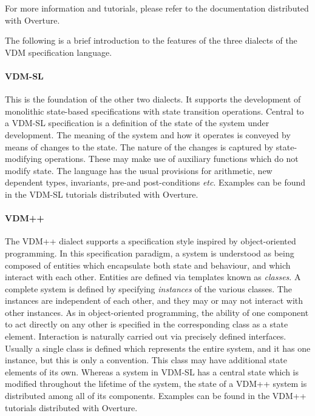 For more information and tutorials, please refer to the documentation distributed with Overture.

The following is a brief introduction to the features of the three dialects of the VDM specification language.
%
\paragraph{VDM-SL}
This is the foundation of the other two dialects.
%
It supports the development of monolithic state-based specifications with state transition operations.
%
Central to a VDM-SL specification is a definition of the state of the system under development.
%
The meaning of the system and how it operates is conveyed by means of changes to the state.
%
The nature of the changes is captured by state-modifying operations.
%
These may make use of auxiliary functions which do not modify state.
%
The language has the usual provisions for arithmetic, new dependent types, invariants, pre-\@ and post-conditions \emph{etc}.
%
Examples can be found in the VDM-SL tutorials distributed with Overture.
%
\paragraph{VDM++}
The VDM++ dialect supports a specification style inspired by object-oriented programming.
%
In this specification paradigm, a system is understood as being composed of entities which encapsulate both state and behaviour, and which interact with each other.
%
Entities are defined via templates known as \emph{classes}.
%
A complete system is defined by specifying \emph{instances} of the various classes.
%
The instances are independent of each other, and they may or may not interact with other instances.
%
As in object-oriented programming, the ability of one component to act directly on any other is specified in the corresponding class as a state element.
%
Interaction is naturally carried out via precisely defined interfaces.
%
Usually a single class is defined which represents the entire system, and it has one instance, but this is only a convention.
%
This class may have additional state elements of its own.
%
Whereas a system in VDM-SL has a central state which is modified throughout the lifetime of the system, the state of a VDM++ system is distributed among all of its components.
%
Examples can be found in the VDM++ tutorials distributed with Overture.
%
